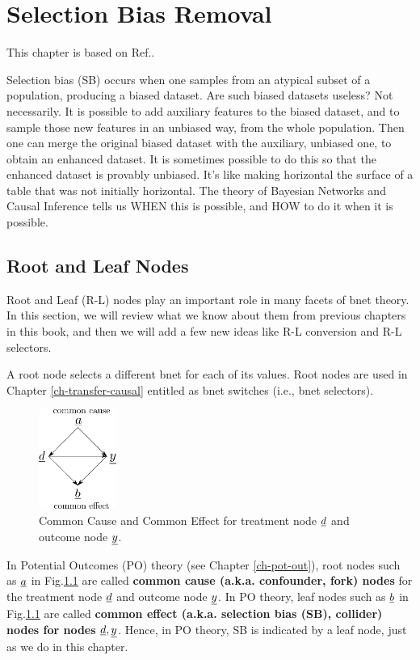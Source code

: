 \chapter{Selection Bias Removal}
\label{ch-sb-removal}
This chapter
is based on Ref.\cite{bare-sb-removal}.

Selection bias (SB)
occurs when one
samples from an
atypical subset
of a
population,
producing a biased dataset.
Are such biased
datasets
useless? Not necessarily.
It is possible to
add auxiliary features
to the biased dataset, and to
sample those new features
in an unbiased way,
 from the whole population.
Then
one can merge
the original
 biased dataset with the
auxiliary, unbiased one,
to obtain an enhanced dataset.
It is sometimes
possible to do this so that the enhanced
dataset is provably
unbiased.
It's like making horizontal
the surface of a table
 that was
 not initially
horizontal.
The theory of Bayesian Networks and Causal
Inference tells us
WHEN this is possible,
and HOW to do it
when it is possible.


\section{Root and Leaf Nodes}

Root and Leaf (R-L) nodes play an important role in many facets of
bnet theory. In this section, we will review what we know
about them from previous chapters in this book, and then we will add a few new
ideas like R-L conversion and R-L selectors.

A root node selects a different bnet 
for each of its values.
Root nodes are used
in Chapter \ref{ch-transfer-causal}
entitled 
as bnet switches (i.e., bnet selectors).




\begin{figure}[h!]
\centering
\includegraphics[width=1in]
{sb-removal/common-cause-effect.png}
\caption{Common Cause
and Common Effect for
treatment node $\rvd$
and outcome node $\rvy$.}
\label{fig-common-cause-effect}
\end{figure}

In Potential
Outcomes (PO) theory
 (see Chapter \ref{ch-pot-out}),
root nodes such
as $\rva$ in
Fig.\ref{fig-common-cause-effect}
are called {\bf common cause
 (a.k.a. confounder, fork) nodes}
for the treatment node $\rvd$
and outcome node $\rvy$.
In PO theory, leaf nodes such as
$\rvb$ in
Fig.\ref{fig-common-cause-effect} are
called
{\bf common effect
(a.k.a. selection bias (SB), collider) nodes
for nodes $\rvd, \rvy$}.
Hence, in PO theory,
SB is indicated
by
a leaf node,
just as we do in this chapter.

